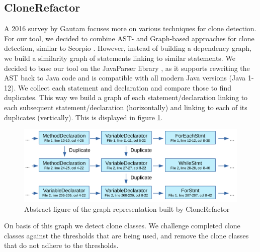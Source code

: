 \documentclass[a4paper]{article}
\begin{document}
\subsection{CloneRefactor}
A 2016 survey by Gautam \cite{gautam2016various} focuses more on various techniques for clone detection. For our tool, we decided to combine AST- and Graph-based approaches for clone detection, similar to Scorpio \cite{higo2013revisiting, kamalpriya2017enhancing}. However, instead of building a dependency graph, we build a similarity graph of statements linking to similar statements. We decided to base our tool on the JavaParser library \cite{tomassetti2017javaparser}, as it supports rewriting the AST back to Java code and is compatible with all modern Java versions (Java 1-12). We collect each statement and declaration and compare those to find duplicates. This way we build a graph of each statement/declaration linking to each subsequent statement/declaration (horizontally) and linking to each of its duplicates (vertically). This is displayed in figure \ref{fig:clonerefactor}.

\begin{figure}[H]
  \includegraphics[width=1\columnwidth]{img/CodeGraph}
  \caption{Abstract figure of the graph representation built by CloneRefactor}
  \label{fig:clonerefactor}
\end{figure}

On basis of this graph we detect clone classes. We challenge completed clone classes against the thresholds that are being used, and remove the clone classes that do not adhere to the thresholds.
\end{document}
